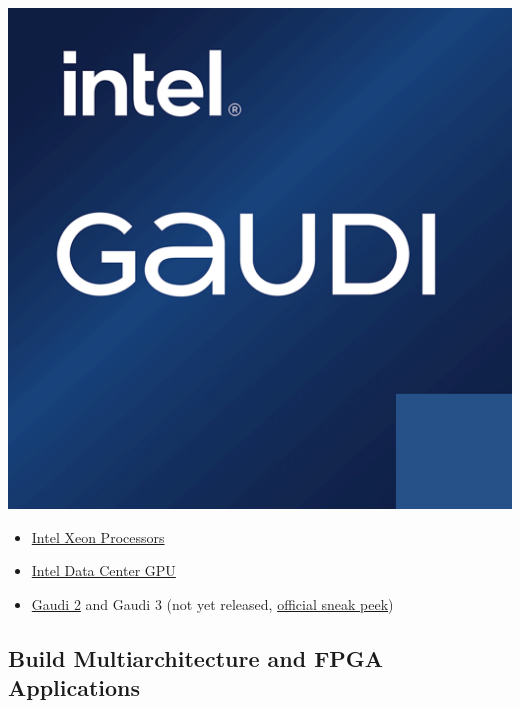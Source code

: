 \documentclass[a4paper]{article}
\begin{document}
    \begin{minipage}{.18\textwidth}
        \includegraphics[width=\textwidth]{img/gaudi_logo.png}
    \end{minipage}

    \begin{itemize}
        \item \href{https://www.intel.com/content/www/us/en/products/details/processors/xeon.html}{Intel Xeon Processors}
        \item \href{https://www.intel.com/content/www/us/en/products/details/discrete-gpus/data-center-gpu.html}{Intel Data Center GPU}
        \item \href{https://www.intel.com/content/www/us/en/developer/articles/technical/habana-gaudi2-processor-for-deep-learning.html}{Gaudi 2} and Gaudi 3 (not yet released, \href{https://www.intel.com/content/www/us/en/newsroom/news/ai-everywhere-core-ultra-5th-gen-xeon-news.html}{official sneak peek})
    \end{itemize}\newpage

    \subsection{Build Multiarchitecture and FPGA Applications}\label{subsection: build multiarchitecture and FPGA applications}
\end{document}
